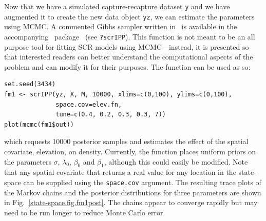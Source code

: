 Now that we have a simulated capture-recapture dataset \texttt{y} and we have
augmented it to create the new data object \texttt{yz}, we can
estimate the parameters using MCMC.  A commented Gibbs sampler written
in \R~is available in the accompanying \R~package \scrbook~(see
\texttt{?scrIPP}). This function is not meant to be an all purpose
tool for fitting SCR models using MCMC---instead, it is presented so
that interested readers can better understand the computational
aspects of the problem and can modify it for their purposes.
The function can be used as so:
\begin{small}
\begin{verbatim}
set.seed(3434)
fm1 <- scrIPP(yz, X, M, 10000, xlims=c(0,100), ylims=c(0,100),
              space.cov=elev.fn,
              tune=c(0.4, 0.2, 0.3, 0.3, 7))
plot(mcmc(fm1$out))
\end{verbatim}
\end{small}
which requests 10000 posterior samples and estimates the effect of the
spatial covariate, elevation, on density. Currently, the function
places uniform priors on the parameters $\sigma$, $\lambda_0$,
$\beta_0$ and $\beta_1$, although this could easily be modified. Note that any spatial
covariate that returns a real value for any location in the
state-space can be supplied using the \texttt{space.cov} argument. The resulting
trace plots of the Markov chains and the posterior distributions for
three parameters are
shown in Fig.~\ref{state-space.fig.fm1post}. The chains appear to
converge rapidly but may need to be run longer to reduce Monte Carlo
error.

